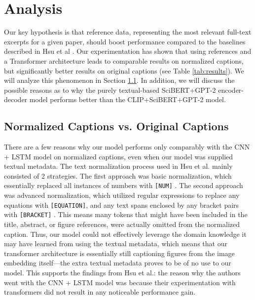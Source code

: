\documentclass{article}
\begin{document}
\section{Analysis}
\label{sec:analysis}

Our key hypothesis is that reference data, representing the most relevant full-text excerpts for a given paper, should boost performance compared to the baselines described in Hsu et al \citep{scicap}. Our experimentation has shown that using references and a Transformer architecture leads to comparable results on normalized captions, but significantly better results on original captions (see Table \ref{tab:results}). We will analyze this phenomenon in Section \ref{sec:normvs}. In addition, we will discuss the possible reasons as to why the purely textual-based SciBERT+GPT-2 encoder-decoder model performs better than the CLIP+SciBERT+GPT-2 model.

\subsection{Normalized Captions vs. Original Captions}
\label{sec:normvs}
There are a few reasons why our model performs only comparably with the CNN + LSTM model on normalized captions, even when our model was supplied textual metadata. The text normalization process used in Hsu et al. mainly consisted of 2 strategies. The first approach was basic normalization, which essentially replaced all instances of numbers with \texttt{[NUM]} \citep{scicap}. The second approach was advanced normalization, which utilized regular expressions to replace any equations with \texttt{[EQUATION]}, and any text spans enclosed by any bracket pairs with \texttt{[BRACKET]} \citep{scicap}. This means many tokens that might have been included in the title, abstract, or figure references, were actually omitted from the normalized caption. Thus, our model could not effectively leverage the domain knowledge it may have learned from using the textual metadata, which means that our transformer architecture is essentially still captioning figures from the image embedding itself---the extra textual metadata proves to be of no use to our model. This supports the findings from Hsu et al.: the reason why the authors went with the CNN + LSTM model was because their experimentation with transformers did not result in any noticeable performance gain.
\end{document}
